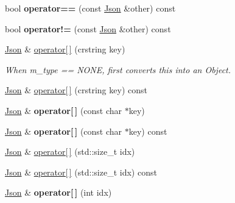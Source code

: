 \begin{DoxyCompactItemize}
bool {\bfseries operator==} (const \hyperlink{classnta_1_1utils_1_1Json}{Json} \&other) const
\item 
\mbox{\label{classnta_1_1utils_1_1Json_a97b88c3b36c4ea7640074b676abe7a89}} 
bool {\bfseries operator!=} (const \hyperlink{classnta_1_1utils_1_1Json}{Json} \&other) const
\item 
\hyperlink{classnta_1_1utils_1_1Json}{Json} \& \hyperlink{classnta_1_1utils_1_1Json_adf2d340a2bf7d59c537e398a1be66cf7}{operator\mbox{[}$\,$\mbox{]}} (crstring key)
\begin{DoxyCompactList}\small\item\em When m\+\_\+type == N\+O\+NE, first converts this into an Object. \end{DoxyCompactList}\item 
\hyperlink{classnta_1_1utils_1_1Json}{Json} \& \hyperlink{classnta_1_1utils_1_1Json_ab3b51a07ebed90330c98fd8e20785781}{operator\mbox{[}$\,$\mbox{]}} (crstring key) const
\item 
\mbox{\label{classnta_1_1utils_1_1Json_a4dcba3e4e113c3204212fea031725c9c}} 
\hyperlink{classnta_1_1utils_1_1Json}{Json} \& {\bfseries operator\mbox{[}$\,$\mbox{]}} (const char $\ast$key)
\item 
\mbox{\label{classnta_1_1utils_1_1Json_adf46f886ad73e0cacb7d0e5cc40841b3}} 
\hyperlink{classnta_1_1utils_1_1Json}{Json} \& {\bfseries operator\mbox{[}$\,$\mbox{]}} (const char $\ast$key) const
\item 
\hyperlink{classnta_1_1utils_1_1Json}{Json} \& \hyperlink{classnta_1_1utils_1_1Json_a236b5885612b74c21fbad169b21eaf55}{operator\mbox{[}$\,$\mbox{]}} (std\+::size\+\_\+t idx)
\item 
\hyperlink{classnta_1_1utils_1_1Json}{Json} \& \hyperlink{classnta_1_1utils_1_1Json_a893f191111e604995488d147aaa711f8}{operator\mbox{[}$\,$\mbox{]}} (std\+::size\+\_\+t idx) const
\item 
\mbox{\label{classnta_1_1utils_1_1Json_a7d094a2061036a579a63923ae30171a4}} 
\hyperlink{classnta_1_1utils_1_1Json}{Json} \& {\bfseries operator\mbox{[}$\,$\mbox{]}} (int idx)
\item 
\mbox{\label{classnta_1_1utils_1_1Json_aba70b2f342f889783480ef72c606b240}} 

\end{DoxyCompactItemize}
